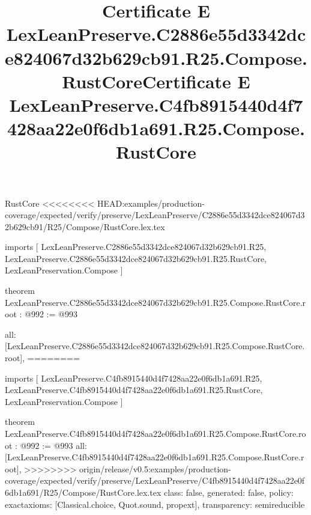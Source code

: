\begin{lexlean}{RustCore}
<<<<<<<< HEAD:examples/production-coverage/expected/verify/preserve/LexLeanPreserve/C2886e55d3342dce824067d32b629cb91/R25/Compose/RustCore.lex.tex
\title{Certificate E LexLeanPreserve.C2886e55d3342dce824067d32b629cb91.R25.Compose.RustCore}
\begin{coremodule}
imports [
  LexLeanPreserve.C2886e55d3342dce824067d32b629cb91.R25,
  LexLeanPreserve.C2886e55d3342dce824067d32b629cb91.R25.RustCore,
  LexLeanPreservation.Compose
]

theorem LexLeanPreserve.C2886e55d3342dce824067d32b629cb91.R25.Compose.RustCore.root : @992 := @993 {
  all: [LexLeanPreserve.C2886e55d3342dce824067d32b629cb91.R25.Compose.RustCore.root],
========
\title{Certificate E LexLeanPreserve.C4fb8915440d4f7428aa22e0f6db1a691.R25.Compose.RustCore}
\begin{coremodule}
imports [
  LexLeanPreserve.C4fb8915440d4f7428aa22e0f6db1a691.R25,
  LexLeanPreserve.C4fb8915440d4f7428aa22e0f6db1a691.R25.RustCore,
  LexLeanPreservation.Compose
]

theorem LexLeanPreserve.C4fb8915440d4f7428aa22e0f6db1a691.R25.Compose.RustCore.root : @992 := @993 {
  all: [LexLeanPreserve.C4fb8915440d4f7428aa22e0f6db1a691.R25.Compose.RustCore.root],
>>>>>>>> origin/release/v0.5:examples/production-coverage/expected/verify/preserve/LexLeanPreserve/C4fb8915440d4f7428aa22e0f6db1a691/R25/Compose/RustCore.lex.tex
  class: false,
  generated: false,
  policy: exact{axioms: [Classical.choice, Quot.sound, propext]},
  transparency: semireducible
}


\end{coremodule}}
\end{coremodule}
\end{lexlean}

